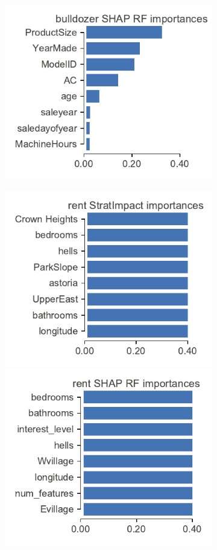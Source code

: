 \documentclass[11pt]{article}
\begin{document}
{\begin{figure}
\begin{subfigure}{1\textwidth}
\includegraphics[scale=0.5]{images/bulldozer-features-shap-rf.pdf}
\vspace{-2mm}\vspace{3mm}
\end{subfigure}%
\hfill
\begin{subfigure}{1\textwidth}
    \centering
\includegraphics[scale=0.5]{images/rent-features.pdf}
\includegraphics[scale=0.5]{images/rent-features-shap-rf.pdf}

\end{subfigure}
\end{figure}}
\end{document}
